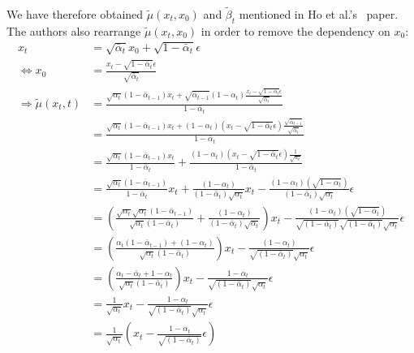 \documentclass[twoside]{article}
\numberwithin{equation}{section}
\numberwithin{figure}{section}
\begin{document}
{
\allowdisplaybreaks \\
We have therefore obtained $\tilde{\mu}(x_t, x_0)$ and $\tilde{\beta}_t$ mentioned in Ho et al.'s~\cite{ho2020denoising} paper. \\
The authors also rearrange $\tilde{\mu}(x_t, x_0)$ in order to remove the dependency on $x_0$: \\
  \begin{align}
    x_t &= \sqrt{\bar{\alpha}_t} x_0 + \sqrt{1 - \bar{\alpha}_t} \epsilon \\
    \Leftrightarrow x_0 &= \frac{x_t - \sqrt{1 - \bar{\alpha}_t} \epsilon}{\sqrt{\bar{\alpha}_t}} \label{eq:x0fromxt} \\
    \Rightarrow \tilde{\mu}(x_t, t) &= \frac{\sqrt{\alpha_t}(1 - \bar{\alpha}_{t-1}) x_t + \sqrt{\bar{\alpha}_{t-1}}(1 - \alpha_t) \frac{x_t - \sqrt{1 - \bar{\alpha}_t} \epsilon}{\sqrt{\bar{\alpha}_t}}}{1 - \bar{\alpha}_t} \\
    &= \frac{\sqrt{\alpha_t}(1 - \bar{\alpha}_{t-1}) x_t + (1 - \alpha_t) \left(x_t - \sqrt{1 - \bar{\alpha}_t} \epsilon \right) \frac{\sqrt{\bar{\alpha}_{t-1}}}{\sqrt{\bar{\alpha}_t}}}{1 - \bar{\alpha}_t} \\
    &= \frac{\sqrt{\alpha_t}(1 - \bar{\alpha}_{t-1}) x_t}{{1 - \bar{\alpha}_t}} + \frac{(1 - \alpha_t) \left(x_t - \sqrt{1 - \bar{\alpha}_t} \epsilon \right) \frac{1}{\sqrt{\alpha_t}}}{1 - \bar{\alpha}_t} \\
    &= \frac{\sqrt{\alpha_t}(1 - \bar{\alpha}_{t-1})}{{1 - \bar{\alpha}_t}} x_t + \frac{(1 - \alpha_t)}{(1 - \bar{\alpha}_t) \sqrt{\alpha_t}} x_t - \frac{(1 - \alpha_t)(\sqrt{1 - \bar{\alpha}_t})}{(1 - \bar{\alpha}_t)\sqrt{\alpha_t}} \epsilon \\
    &= \left( \frac{\sqrt{\alpha_t} \sqrt{\alpha_t}(1 - \bar{\alpha}_{t-1})}{\sqrt{\alpha_t} ({1 - \bar{\alpha}_t})}+ \frac{(1 - \alpha_t)}{(1 - \bar{\alpha}_t) \sqrt{\alpha_t}} \right) x_t - \frac{(1 - \alpha_t)(\sqrt{1 - \bar{\alpha}_t})}{\sqrt{(1 - \bar{\alpha}_t)}\sqrt{(1 - \bar{\alpha}_t)}\sqrt{\alpha_t}} \epsilon \\
    &= \left( \frac{\alpha_t (1 - \bar{\alpha}_{t-1}) + (1 - \alpha_t)}{\sqrt{\alpha_t} ({1 - \bar{\alpha}_t})} \right) x_t - \frac{(1 - \alpha_t)}{\sqrt{(1 - \bar{\alpha}_t)}\sqrt{\alpha_t}} \epsilon \\
    &= \left( \frac{\alpha_t - \bar{\alpha}_{t} + 1 - \alpha_t}{\sqrt{\alpha_t} ({1 - \bar{\alpha}_t})} \right) x_t - \frac{1 - \alpha_t}{\sqrt{(1 - \bar{\alpha}_t)}\sqrt{\alpha_t}} \epsilon \\
    &= \frac{1}{\sqrt{\alpha_t}} x_t - \frac{1 - \alpha_t}{\sqrt{(1 - \bar{\alpha}_t)}\sqrt{\alpha_t}} \epsilon \\
    &= \frac{1}{\sqrt{\alpha_t}} \left( x_t - \frac{1 - \alpha_t}{\sqrt{(1 - \bar{\alpha}_t)}} \epsilon \right)
  \end{align}
}
\end{document}
